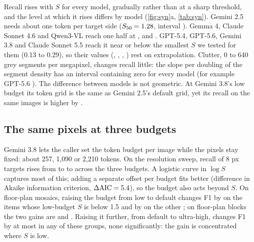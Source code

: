 Recall rises with $S$ for every model, gradually rather than at a sharp threshold, and the level at which it rises differs by model (\cref{fig:syn}a, \cref{tab:syn}). Gemini 2.5 needs about one token per target side ($S_{50} = 1.28$, interval \XSfiftyCIgeminiTwoFive). Gemma 4, Claude Sonnet 4.6 and Qwen3-VL reach one half at \XSfiftygemmaFour{} \XSfiftyCIgemmaFour, \XSfiftysonnetFourSix{} \XSfiftyCIsonnetFourSix{} and \XSfiftyqwenThreevl{} \XSfiftyCIqwenThreevl. GPT-5.4, GPT-5.6, Gemini 3.8 and Claude Sonnet 5.5 reach it near or below the smallest $S$ we tested for them (0.13 to 0.29), so their values (\XSfiftygptFiveFour, \XSfiftygptFiveSix, \XSfiftygemThreeEight, \XSfiftysonnetFiveFive) rest on extrapolation. Clutter, 0 to 640 grey segments per megapixel, changes recall little: the slope per doubling of the segment density has an interval containing zero for every model (for example GPT-5.6 \XclutSlopegptFiveSix{} \XclutSlopeCIgptFiveSix). The difference between models is not geometric. At Gemini 3.8's low budget its token grid is the same as Gemini 2.5's default grid, yet its recall on the same images is higher by \XtOneHThree{} \XtOneHThreeCI.

\subsection{The same pixels at three budgets}
\label{sec:budget}

Gemini 3.8 lets the caller set the token budget per image while the pixels stay fixed: about 257, 1{,}090 or 2{,}210 tokens. On the resolution sweep, recall of 8 px targets rises from \CbudEightLo{} to \CbudEightDef{} to \CbudEightUh{} across the three budgets. A logistic curve in $\log S$ captures most of this; adding a separate offset per budget fits better (difference in Akaike information criterion, $\Delta\mathrm{AIC} = 5.4$), so the budget also acts beyond $S$. On floor-plan mosaics, raising the budget from low to default changes F1 by \XfTOnesheetssmallDL{} \XfTOnesheetssmallDLCI{} on the \XfTOnesheetssmallN{} items whose low-budget $S$ is below 1.5 and by \XfTOnesheetslargeDL{} \XfTOnesheetslargeDLCI{} on the other \XfTOnesheetslargeN; on floor-plan blocks the two gains are \XfTOnebenchsmallDL{} \XfTOnebenchsmallDLCI{} and \XfTOnebenchlargeDL{} \XfTOnebenchlargeDLCI. Raising it further, from default to ultra-high, changes F1 by at most \XfTOnesheetslargeUD{} in any of these groups, none significantly: the gain is concentrated where $S$ is low.

